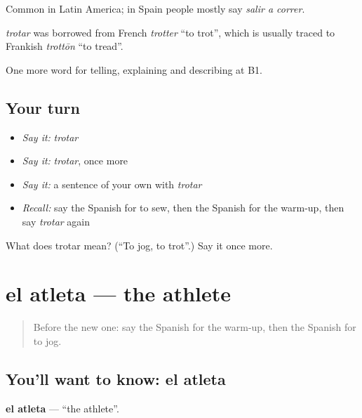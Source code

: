 Common in Latin America; in Spain people mostly say \emph{salir a correr}.

\begin{cousinweb}
\emph{trotar} was borrowed from French \emph{trotter} \textquotedblleft{}to trot\textquotedblright{}, which is usually traced to Frankish \emph{trottōn} \textquotedblleft{}to tread\textquotedblright{}.
\end{cousinweb}

\begin{grammarlens}[title={What you've built}]
One more word for telling, explaining and describing at B1.
\end{grammarlens}

\subsection*{Your turn}
\begin{itemize}
\raggedright
  \item \emph{Say it:} \emph{trotar}
  \item \emph{Say it:} \emph{trotar}, once more
  \item \emph{Say it:} a sentence of your own with \emph{trotar}
  \item \emph{Recall:} say the Spanish for to sew, then the Spanish for the warm-up, then say \emph{trotar} again
\end{itemize}

\begin{tcolorbox}[breakable,colback=teal!4,colframe=teal!35!black,title={Before you move on}]
What does trotar mean? (\textquotedblleft{}To jog, to trot\textquotedblright{}.) Say it once more.
\end{tcolorbox}
\section[el atleta]{el atleta — the athlete}

\label{lesson:ES-C755-atleta}



\begin{quote}
Before the new one: say the Spanish for the warm-up, then the Spanish for to jog.
\end{quote}

\subsection*{You'll want to know: el atleta}
\textbf{el atleta} — \textquotedblleft{}the athlete\textquotedblright{}.

